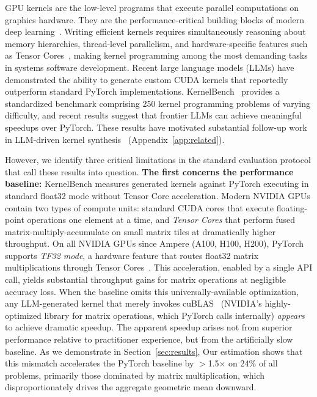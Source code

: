 \documentclass[11pt]{article}
\begin{document}
GPU kernels are the low-level programs that execute parallel computations on graphics hardware. They are the performance-critical building blocks of modern deep learning~\cite{robustkbench,kernelbench}. Writing efficient kernels requires simultaneously reasoning about memory hierarchies, thread-level parallelism, and hardware-specific features such as Tensor Cores~\cite{nvidia_h200_datasheet,DBLP:journals/corr/abs-2602-24286}, making kernel programming among the most demanding tasks in systems software development. Recent large language models (LLMs) have demonstrated the ability to generate custom CUDA kernels that reportedly outperform standard PyTorch implementations. KernelBench~\cite{kernelbench} provides a standardized benchmark comprising 250 kernel programming problems of varying difficulty, and recent results suggest that frontier LLMs can achieve meaningful speedups over PyTorch. These results have motivated substantial follow-up work in LLM-driven kernel synthesis~\cite{cao2026k,DBLP:journals/corr/abs-2602-24286,du2026kernel,liu2026dr,wiedemann2026kernelfoundry} (Appendix~\ref{app:related}).


However, we identify three critical limitations in the standard evaluation protocol that call these results into question.
\textbf{The first concerns the performance baseline: }KernelBench measures generated kernels against PyTorch executing in standard float32 mode without Tensor Core acceleration. Modern NVIDIA GPUs contain two types of compute units: standard CUDA cores that execute floating-point operations one element at a time, and \emph{Tensor Cores} that perform fused matrix-multiply-accumulate on small matrix tiles at dramatically higher throughput. On all NVIDIA GPUs since Ampere (A100, H100, H200), PyTorch supports \emph{TF32 mode}, a hardware feature that routes float32 matrix multiplications through Tensor Cores~\cite{tf32nvidia}. This acceleration, enabled by a single API call, yields substantial throughput gains for matrix operations at negligible accuracy loss. When the baseline omits this universally-available optimization, any LLM-generated kernel that merely invokes cuBLAS~\cite{DBLP:conf/ipps/AnztSTLYD14,DBLP:journals/tpds/KurzakAGD16} (NVIDIA's highly-optimized library for matrix operations, which PyTorch calls internally) \emph{appears} to achieve dramatic speedup. The apparent speedup arises not from superior performance relative to practitioner experience, but from the artificially slow baseline. As we demonstrate in Section~\ref{sec:results}, Our estimation shows that this mismatch accelerates the PyTorch baseline by $>$1.5$\times$ on 24\% of all problems, primarily those dominated by matrix multiplication, which disproportionately drives the aggregate geometric mean downward.
\end{document}
